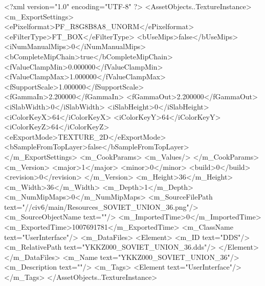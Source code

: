 <?xml version="1.0" encoding="UTF-8" ?>
<AssetObjects..TextureInstance>
	<m_ExportSettings>
		<ePixelformat>PF_R8G8B8A8_UNORM</ePixelformat>
		<eFilterType>FT_BOX</eFilterType>
		<bUseMips>false</bUseMips>
		<iNumManualMips>0</iNumManualMips>
		<bCompleteMipChain>true</bCompleteMipChain>
		<fValueClampMin>0.000000</fValueClampMin>
		<fValueClampMax>1.000000</fValueClampMax>
		<fSupportScale>1.000000</fSupportScale>
		<fGammaIn>2.200000</fGammaIn>
		<fGammaOut>2.200000</fGammaOut>
		<iSlabWidth>0</iSlabWidth>
		<iSlabHeight>0</iSlabHeight>
		<iColorKeyX>64</iColorKeyX>
		<iColorKeyY>64</iColorKeyY>
		<iColorKeyZ>64</iColorKeyZ>
		<eExportMode>TEXTURE_2D</eExportMode>
		<bSampleFromTopLayer>false</bSampleFromTopLayer>
	</m_ExportSettings>
	<m_CookParams>
		<m_Values/>
	</m_CookParams>
	<m_Version>
		<major>1</major>
		<minor>0</minor>
		<build>0</build>
		<revision>0</revision>
	</m_Version>
	<m_Height>36</m_Height>
	<m_Width>36</m_Width>
	<m_Depth>1</m_Depth>
	<m_NumMipMaps>0</m_NumMipMaps>
	<m_SourceFilePath text="//civ6/main/Resources_SOVIET_UNION_36.png"/>
	<m_SourceObjectName text=""/>
	<m_ImportedTime>0</m_ImportedTime>
	<m_ExportedTime>1007691781</m_ExportedTime>
	<m_ClassName text="UserInterface"/>
	<m_DataFiles>
		<Element>
			<m_ID text="DDS"/>
			<m_RelativePath text="YKKZ000_SOVIET_UNION_36.dds"/>
		</Element>
	</m_DataFiles>
	<m_Name text="YKKZ000_SOVIET_UNION_36"/>
	<m_Description text=""/>
	<m_Tags>
		<Element text="UserInterface"/>
	</m_Tags>
</AssetObjects..TextureInstance>


